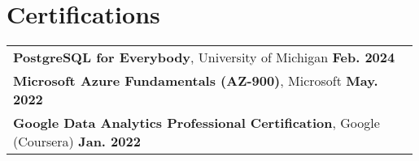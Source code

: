 \documentclass[letterpaper,11pt]{article}
\begin{document}
\section{Certifications}
\begin{tabular}{p{0.99\linewidth}}
    \hspace{0.15in}\textbf{PostgreSQL for Everybody}, University of Michigan
        \hfill \textbf{Feb. 2024} \\
    \hspace{0.15in}\textbf{Microsoft Azure Fundamentals (AZ-900)}, Microsoft
        \hfill \textbf{May. 2022} \\
    \hspace{0.15in}\textbf{Google Data Analytics Professional Certification}, Google (Coursera)
        \hfill \textbf{Jan. 2022} \\
\end{tabular}
\end{document}
